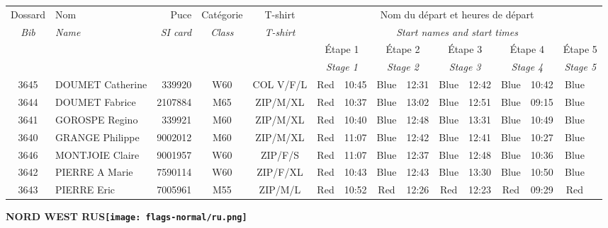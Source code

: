 \documentclass{report}
\begin{document}
  \begin{longtable}{|c|l|r|c|c|*{5}{cc|}}
    Dossard & Nom  & Puce    & Catégorie & T-shirt & \multicolumn{10}{c|}{Nom du départ et heures de départ} \\
    \itshape Bib     & \itshape Name & \itshape SI card & \itshape Class  & \itshape  T-shirt  & \multicolumn{10}{c|}{\itshape Start names and start times} \\
    \hline
    & & & & & \multicolumn{2}{c|}{Étape 1} & \multicolumn{2}{c|}{Étape 2} & \multicolumn{2}{c|}{Étape 3} & \multicolumn{2}{c|}{Étape 4} & \multicolumn{2}{c|}{Étape 5} \\
    & & & & & \multicolumn{2}{c|}{\itshape Stage 1} & \multicolumn{2}{c|}{\itshape Stage 2} & \multicolumn{2}{c|}{\itshape Stage 3} & \multicolumn{2}{c|}{\itshape Stage 4} & \multicolumn{2}{c|}{\itshape Stage 5} \\
    \hline
    3645 & DOUMET Catherine & 339920 & W60 & COL V/F/L & Red & 10:45 & Blue & 12:31 & Blue & 12:42 & Blue & 10:42 & Blue &  \\
    3644 & DOUMET Fabrice & 2107884 & M65 & ZIP/M/XL & Red & 10:37 & Blue & 13:02 & Blue & 12:51 & Blue & 09:15 & Blue &  \\
    3641 & GOROSPE Regino & 339921 & M60 & ZIP/M/XL & Red & 10:40 & Blue & 12:48 & Blue & 13:31 & Blue & 10:49 & Blue &  \\
    3640 & GRANGE Philippe & 9002012 & M60 & ZIP/M/XL & Red & 11:07 & Blue & 12:42 & Blue & 12:41 & Blue & 10:27 & Blue &  \\
    3646 & MONTJOIE Claire & 9001957 & W60 & ZIP/F/S & Red & 11:07 & Blue & 12:37 & Blue & 12:48 & Blue & 10:36 & Blue &  \\
    3642 & PIERRE A Marie & 7590114 & W60 & ZIP/F/XL & Red & 10:43 & Blue & 12:43 & Blue & 13:30 & Blue & 10:50 & Blue &  \\
    3643 & PIERRE Eric & 7005961 & M55 & ZIP/M/L & Red & 10:52 & Red & 12:26 & Red & 12:23 & Red & 09:29 & Red &  \\
  \end{longtable}
\newpage
  \Huge \centering \bfseries NORD WEST  RUS\normalfont \footnotesize \sffamily \hfill \texttt{[image: flags-normal/ru.png]} \newline 
\end{document}
